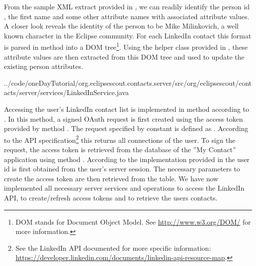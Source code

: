 \documentclass[a4paper,10pt,twoside]{book}
\begin{document}
From the sample XML extract provided in , we can readily identify the person id , the first name  and some other attribute names with associated attribute values. 
A closer look reveals the identity of the person to be Mike Milinkovich, a well known character in the Eclipse community. 
For each LinkedIn contact this format is parsed in method  into a DOM tree\footnote{
DOM stands for Document Object Model. See \url{http://www.w3.org/DOM/} for more information.
}. 
Using the  helper class provided in , these attribute values are then extracted from this DOM tree and used to update the existing person attributes. 


{../code/oneDayTutorial/org.eclipsescout.contacts.server/src/org/eclipsescout/contacts/server/services/LinkedInService.java}

Accessing the user's LinkedIn contact list is implemented in method  according to .
In this method, a signed OAuth request is first created using the access token provided by method . 
The request specified by constant  is defined as . 
According to the API specification\footnote{
See the LinkedIn API documented for more specific information: \url{https://developer.linkedin.com/documents/linkedin-api-resource-map}.
} 
this returns all connections of the user.
To sign the request, the access token is retrieved from the database of the ''My Contact'' application using method . 
According to the implementation provided in  the user id is first obtained from the user's server session. 
The necessary parameters to create the access token are then retrieved from the  table. 
We have now implemented all necessary server services and operations to access the LinkedIn API, to create/refresh access tokens and to retrieve the users contacts. 

\end{document}
